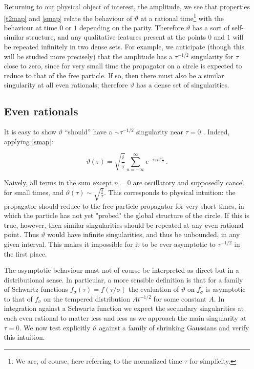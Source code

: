 \documentclass{article}
\newcommand{\T}{\ensuremath{\vartheta}}
\newcommand{\sumZ}{\sum_{n=-\infty}^{\infty}}
\begin{document}
Returning to our physical object of interest, the amplitude, we see that properties \eqref{t2map} and \eqref{smap} relate the behaviour of $\T$ at a rational time\footnote{We are, of course, here referring to the normalized time $\tau$ for simplicity.} with the behaviour at time $0$ or $1$ depending on the parity. Therefore $\T$ has a sort of self-similar structure, and any qualitative features present at the points $0$ and $1$ will be repeated infinitely in two dense sets. For example, we anticipate (though this will be studied more precisely) that the amplitude has a $\tau^{-1/2}$ singularity for $\tau$ close to zero, since for very small time the propagator on a circle is expected to reduce to that of the free particle. If so, then there must also be a similar singularity at all even rationals; therefore $\T$ has a dense set of singularities.


\subsection{Even rationals}\label{sec:evens}

It is easy to show $\T$ ``should'' have a $\sim \tau^{-1/2}$ singularity near $\tau = 0$ \cite{boxpdf}. Indeed, applying  \eqref{smap}:

\begin{equation}
    \vartheta(\tau) = \sqrt{\frac{i}{\tau}} \sumZ e^{-i\pi n^2 \frac{1}{\tau}}\,.
\end{equation}

Naively, all terms in the sum except $n=0$ are oscillatory and supposedly cancel for small times, and $\vartheta(\tau) \sim \sqrt{\frac{i}{\tau}}$. This corresponds to physical intuition: the propagator should reduce to the free particle propagator for very short times, in which the particle has not yet "probed" the global structure of the circle. If this is true, however, then similar singularities should be repeated at any even rational point. Thus $\T$ would have infinite singularities, and thus be unbounded, in any given interval. This makes it impossible for it to be ever asymptotic to $\tau^{-1/2}$ in the first place.

The asymptotic behaviour must not of course be interpreted as direct but in a distributional sense. In particular, a more sensible definition is that for a family of Schwartz functions $f_\sigma(\tau) = f(\tau/\sigma)$ the evaluation of $\vartheta$ on $f_\sigma$ is asymptotic to that of $f_\sigma$ on the tempered distribution $A t^{-1/2}$ for some constant $A$. In integration against a Schwartz function we expect the secundary singularities at each even rational to matter less and less as we approach the main singularity at $\tau = 0$. We now test explicitly $\vartheta$ against a family of shrinking Gaussians and verify this intuition.
\end{document}

